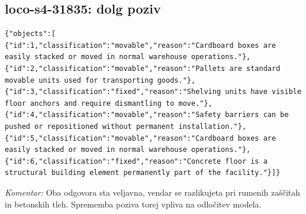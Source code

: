 \documentclass[11pt,a4paper]{article}
\begin{document}
\subsection{loco-s4-31835: dolg poziv}
\begin{lstlisting}
{"objects":[
{"id":1,"classification":"movable","reason":"Cardboard boxes are easily stacked or moved in normal warehouse operations."},
{"id":2,"classification":"movable","reason":"Pallets are standard movable units used for transporting goods."},
{"id":3,"classification":"fixed","reason":"Shelving units have visible floor anchors and require dismantling to move."},
{"id":4,"classification":"movable","reason":"Safety barriers can be pushed or repositioned without permanent installation."},
{"id":5,"classification":"movable","reason":"Cardboard boxes are easily stacked or moved in normal warehouse operations."},
{"id":6,"classification":"fixed","reason":"Concrete floor is a structural building element permanently part of the facility."}]}
\end{lstlisting}
\textit{Komentar:} Oba odgovora sta veljavna, vendar se razlikujeta pri rumenih zaščitah in betonskih tleh. Sprememba poziva torej vpliva na odločitev modela.

\end{document}
